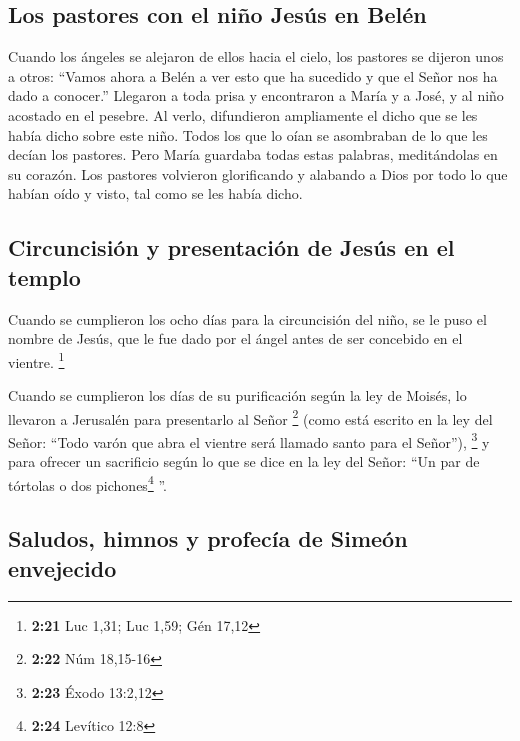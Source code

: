 \hypertarget{los-pastores-con-el-niuxf1o-jesuxfas-en-beluxe9n}{%
\subsection{Los pastores con el niño Jesús en
Belén}\label{los-pastores-con-el-niuxf1o-jesuxfas-en-beluxe9n}}

 Cuando los ángeles se alejaron de ellos hacia el cielo,
los pastores se dijeron unos a otros: ``Vamos ahora a Belén a ver esto
que ha sucedido y que el Señor nos ha dado a conocer.'' 
Llegaron a toda prisa y encontraron a María y a José, y al niño acostado
en el pesebre.  Al verlo, difundieron ampliamente el
dicho que se les había dicho sobre este niño.  Todos los
que lo oían se asombraban de lo que les decían los pastores.
 Pero María guardaba todas estas palabras, meditándolas
en su corazón.  Los pastores volvieron glorificando y
alabando a Dios por todo lo que habían oído y visto, tal como se les
había dicho.

\hypertarget{circuncisiuxf3n-y-presentaciuxf3n-de-jesuxfas-en-el-templo}{%
\subsection{Circuncisión y presentación de Jesús en el
templo}\label{circuncisiuxf3n-y-presentaciuxf3n-de-jesuxfas-en-el-templo}}

 Cuando se cumplieron los ocho días para la circuncisión
del niño, se le puso el nombre de Jesús, que le fue dado por el ángel
antes de ser concebido en el vientre. \footnote{\textbf{2:21} Luc 1,31;
  Luc 1,59; Gén 17,12}

 Cuando se cumplieron los días de su purificación según
la ley de Moisés, lo llevaron a Jerusalén para presentarlo al Señor
\footnote{\textbf{2:22} Núm 18,15-16}  (como está escrito
en la ley del Señor: ``Todo varón que abra el vientre será llamado santo
para el Señor''), \footnote{\textbf{2:23} Éxodo 13:2,12} 
y para ofrecer un sacrificio según lo que se dice en la ley del Señor:
``Un par de tórtolas o dos pichones\footnote{\textbf{2:24} Levítico 12:8}
''.

\hypertarget{saludos-himnos-y-profecuxeda-de-simeuxf3n-envejecido}{%
\subsection{Saludos, himnos y profecía de Simeón
envejecido}\label{saludos-himnos-y-profecuxeda-de-simeuxf3n-envejecido}}

